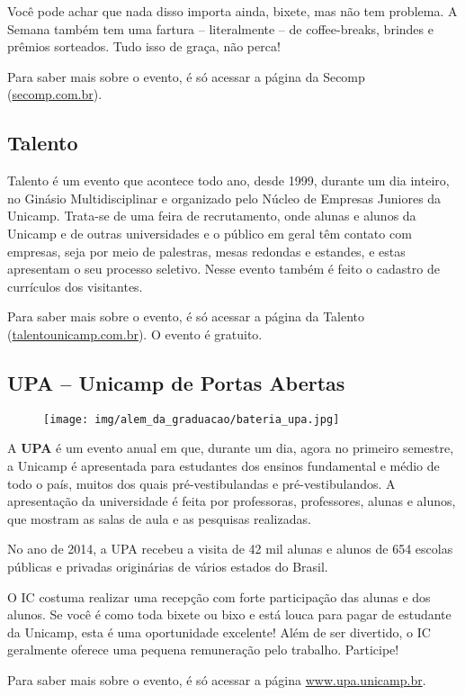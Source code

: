 Você pode achar que nada disso importa ainda, bixete, mas não tem problema. A
Semana também tem uma fartura -- literalmente -- de coffee-breaks, brindes e
prêmios sorteados. Tudo isso de graça, não perca!

Para saber mais sobre o evento, é só acessar a página da Secomp
(\url{secomp.com.br}).

\subsection{Talento}

Talento é um evento que acontece todo ano, des\-de 1999, durante um dia
inteiro, no Ginásio Multidisciplinar e organizado pelo Núcleo de Empresas
Juniores da Unicamp. Trata-se de uma feira de recrutamento, onde alunas e
alunos da Unicamp e de outras universidades e o público em geral têm contato
com empresas, seja por meio de palestras, mesas redondas e estandes, e estas
apresentam o seu processo seletivo. Nesse evento também é feito o cadastro de
currículos dos visitantes.

Para saber mais sobre o evento, é só acessar a página da Talento
(\url{talentounicamp.com.br}). O evento é gratuito.

\subsection{UPA -- Unicamp de Portas Abertas}

\begin{figure}[h!]
  \centering
  \texttt{[image: img/alem\_da\_graduacao/bateria\_upa.jpg]}
\end{figure}

A \textbf{UPA} é um evento anual em que, durante um dia, agora no primeiro
semestre, a Unicamp é apresentada para estudantes dos ensinos fundamental e
médio de todo o país, muitos dos quais pré-vestibulandas e pré-vestibulandos. A
apresentação da universidade é feita por professoras, professores, alunas e
alunos, que mostram as salas de aula e as pesquisas realizadas.

No ano de 2014, a UPA recebeu a visita de 42 mil alunas e alunos de 654 escolas
públicas e privadas originárias de vários estados do Brasil.

O IC costuma realizar uma recepção com forte participação das alunas e dos
alunos. Se você é como toda bixete ou bixo e está louca para pagar de estudante
da Unicamp, esta é uma oportunidade excelente! Além de ser divertido, o IC
geralmente oferece uma pequena remuneração pelo trabalho. Participe!

Para saber mais sobre o evento, é só acessar a página \url{www.upa.unicamp.br}.
